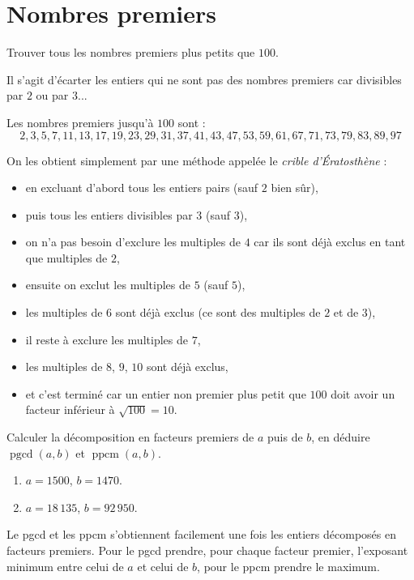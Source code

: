 \documentclass[11pt,class=report,crop=false]{standalone}
\newcommand{\pgcd}{\mathop{\mathrm{pgcd}}\nolimits}
\newcommand{\ppcm}{\mathop{\mathrm{ppcm}}\nolimits}
\begin{document}
\section{Nombres premiers}

\exercice{}
\enonce
Trouver tous les nombres premiers plus petits que $100$.
\finenonce

\indication
Il s'agit d'écarter les entiers qui ne sont pas des nombres premiers car divisibles par $2$ ou par $3$...
\finindication

\correction
Les nombres premiers jusqu'à $100$ sont :
$$2, 3, 5, 7, 11, 13, 17, 19, 23, 29, 31, 37, 41, 43, 47, 53, 59, 61, 67, 71, 73, 79, 83, 89, 97$$

On les obtient simplement par une méthode appelée le \emph{crible d'Ératosthène} :
\begin{itemize}
    \item en excluant d'abord tous les entiers pairs (sauf $2$ bien sûr),
    \item puis tous les entiers divisibles par $3$ (sauf $3$),
    \item on n'a pas besoin d'exclure les multiples de $4$ car ils sont déjà exclus en tant que multiples de $2$,
    \item ensuite on exclut les multiples de $5$ (sauf $5$),
    \item les multiples de $6$ sont déjà exclus (ce sont des multiples de $2$ et de $3$),
    \item il reste à exclure les multiples de $7$,
    \item les multiples de $8$, $9$, $10$ sont déjà exclus,
    \item et c'est terminé car un entier non premier plus petit que $100$ doit avoir un facteur inférieur à $\sqrt{100}=10$.
\end{itemize}
\fincorrection
\finexercice



\exercice{}
\enonce
Calculer la décomposition en facteurs premiers de $a$ puis de $b$, en déduire $\pgcd(a,b)$ et $\ppcm(a,b)$.
\begin{enumerate}
    \item $a=1500$, $b=1470$.
    \item $a=18\,135$, $b=92\,950$.
\end{enumerate}
\finenonce

\indication
Le pgcd et les ppcm s'obtiennent facilement une fois les entiers décomposés en facteurs premiers.
Pour le pgcd prendre, pour chaque facteur premier, l'exposant minimum entre celui de $a$ et celui de $b$, pour le ppcm prendre le maximum.
\finindication
\end{document}
